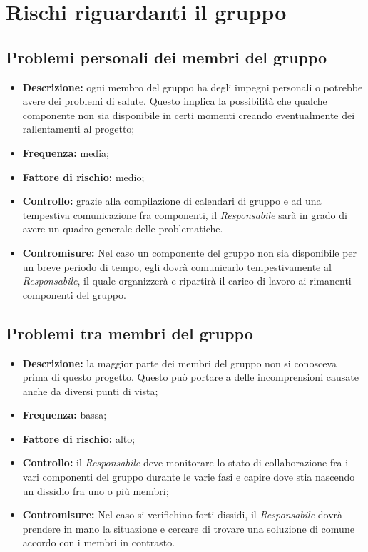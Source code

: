\documentclass[../PianodiProgetto.tex]{subfiles}
\begin{document}
	\section{Rischi riguardanti il gruppo}
	\subsection{Problemi personali dei membri del gruppo}
	\begin{itemize}
		\item \textbf{Descrizione:} ogni membro del gruppo ha degli impegni personali o potrebbe avere dei problemi di salute. Questo implica la possibilità che qualche componente non sia disponibile in certi momenti creando eventualmente dei rallentamenti al progetto;
		\item \textbf{Frequenza:} media;
		\item \textbf{Fattore di rischio:} medio;
		\item \textbf{Controllo:} grazie alla compilazione di calendari di gruppo e ad una tempestiva comunicazione fra componenti, il \textit{Responsabile} sarà in grado di avere un quadro generale delle problematiche.
		\item \textbf{Contromisure:} Nel caso un componente del gruppo non sia disponibile per un breve periodo di tempo, egli dovrà comunicarlo tempestivamente al \textit{Responsabile}, il quale organizzerà e ripartirà il carico di lavoro ai rimanenti componenti del gruppo. 
	\end{itemize}
	
	\subsection{Problemi tra membri del gruppo}
	\begin{itemize}
		\item \textbf{Descrizione:} la maggior parte dei membri del gruppo non si conosceva prima di questo progetto. Questo può portare a delle incomprensioni causate anche da diversi punti di vista;
		\item \textbf{Frequenza:} bassa;
		\item \textbf{Fattore di rischio:} alto;
		\item \textbf{Controllo:} il \textit{Responsabile} deve monitorare lo stato di collaborazione fra i vari componenti del gruppo durante le varie fasi e capire dove stia nascendo un dissidio fra uno o più membri;
		\item \textbf{Contromisure:} Nel caso si verifichino forti dissidi, il \textit{Responsabile} dovrà prendere in mano la situazione e cercare di trovare una soluzione di comune accordo con i membri in contrasto. 
	\end{itemize}
	
\end{document}

